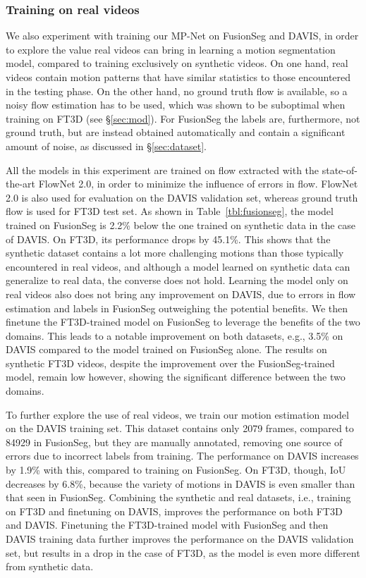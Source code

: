 \subsubsection{Training on real videos}
\label{sec:realvidtrain}
We also experiment with training our MP-Net on FusionSeg and DAVIS, in order to
explore the value real videos can bring in learning a motion segmentation
model, compared to training exclusively on synthetic videos. On one hand, real
videos contain motion patterns that have similar statistics to those
encountered in the testing phase. On the other hand, no ground truth flow
is available, so a noisy flow estimation has to be used, which was shown to be suboptimal when
training on FT3D (see \S\ref{sec:mod}). For FusionSeg the labels are, furthermore, not ground truth, but are instead obtained automatically and contain a significant amount of noise, as discussed in \S\ref{sec:dataset}.

All the models in this experiment are trained on flow extracted with the
state-of-the-art FlowNet 2.0, in order to
minimize the influence of errors in flow. FlowNet 2.0 is also used for
evaluation on the DAVIS validation set, whereas ground truth flow is used for
FT3D test set. As shown in Table~\ref{tbl:fusionseg}, the model trained on
FusionSeg is 2.2\% below the one trained on synthetic data in the case of
DAVIS. On FT3D, its performance drops by 45.1\%. This shows that the synthetic
dataset contains a lot more challenging motions than those typically
encountered in real videos, and although a model learned on synthetic data can
generalize to real data, the converse does not hold. Learning the model only on
real videos also does not bring any improvement on DAVIS, due to errors in flow
estimation and labels in FusionSeg outweighing the potential benefits. We then
finetune the FT3D-trained model on FusionSeg to leverage the benefits of the
two domains. This leads to a notable improvement on both datasets, e.g., 3.5\%
on DAVIS compared to the model trained on FusionSeg alone. The results on
synthetic FT3D videos, despite the improvement over the FusionSeg-trained
model, remain low however, showing the significant difference between the two
domains.

To further explore the use of real videos, we train our motion estimation model
on the DAVIS training set. This dataset contains only 2079 frames, compared to
84929 in FusionSeg, but they are manually annotated, removing one source of
errors due to incorrect labels from training. The performance on DAVIS
increases by 1.9\% with this, compared to training on FusionSeg. On FT3D,
though, IoU decreases by 6.8\%, because the variety of motions in DAVIS is even
smaller than that seen in FusionSeg. Combining the synthetic and real datasets,
i.e., training on FT3D and finetuning on DAVIS, improves the performance on
both FT3D and DAVIS.  Finetuning the FT3D-trained model with FusionSeg and then
DAVIS training data further improves the performance on the DAVIS validation
set, but results in a drop in the case of FT3D, as the model is even
more different from synthetic data.

